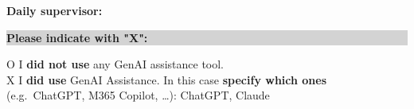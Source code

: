 \vspace{1em}

\textbf{Daily supervisor:} \dotfill

\vspace{2em}

\noindent
\colorbox{lightgray}{\parbox{\dimexpr\linewidth-2\fboxsep\relax}{\textbf{Please indicate with "X":}}}

\vspace{1em}

O I \textbf{did not use} any GenAI assistance tool. \\[1em]

X I \textbf{did use} GenAI Assistance. In this case \textbf{specify which ones} (e.g.\ ChatGPT, M365 Copilot, …): ChatGPT, Claude

\newpage



\newcommand{\Cell}[1]{\begin{minipage}[t]{\linewidth}\raggedright\small #1\end{minipage}}

\setlength{\tabcolsep}{6pt}
\renewcommand{\arraystretch}{1.2}

